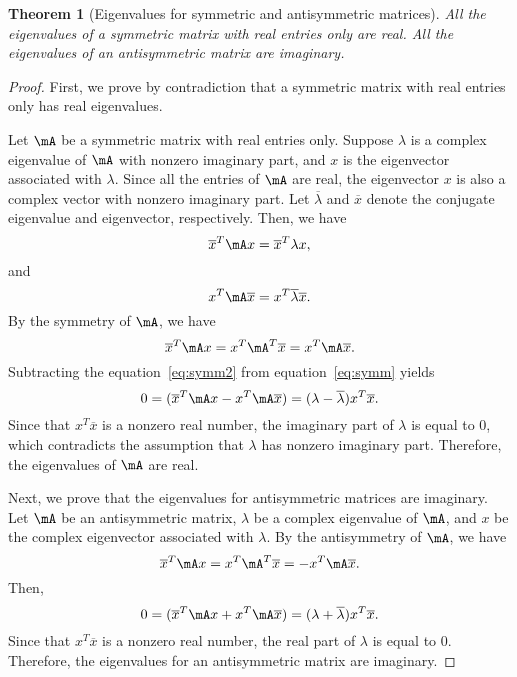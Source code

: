\documentclass[11pt]{article}
\theoremstyle{plain}
\newtheorem{thm}{Theorem}[section]
\theoremstyle{definition}
\begin{document}
\begin{thm}[Eigenvalues for symmetric and antisymmetric matrices]\label{thm:symmeign}
All the eigenvalues of a symmetric matrix with real entries only are real. All the eigenvalues of an antisymmetric matrix are imaginary.
\end{thm}
\begin{proof}
	First, we prove by contradiction that a symmetric matrix with real entries only has real eigenvalues. 
	
	Let  $\mA$  be a symmetric  matrix with real entries only. Suppose $\lambda$  is a complex eigenvalue of $\mA$ with nonzero imaginary part, and $x$ is the eigenvector associated with $\lambda$. Since all the entries of $\mA$ are real, the eigenvector $x$ is also a complex vector with nonzero imaginary part. Let $\overline \lambda$ and $\overline x$ denote the conjugate eigenvalue and eigenvector, respectively. Then,  we have
	\begin{equation}\label{eq:symm}
		\overline x^T \mA x = \overline x^T \lambda x,
	\end{equation} 
	and
	\begin{equation}\label{eq:symm2}
		x^T \mA \overline x = x^T \overline \lambda \overline x.
	\end{equation}
	 By the symmetry of $\mA$, we have
	\[ \overline x^T \mA x  = x^T \mA^T \overline x = x^T \mA \overline x .\] 
	 Subtracting the equation~\eqref{eq:symm2} from equation~\eqref{eq:symm} yields	\[  0 = ( \overline x^T \mA x -  x^T \mA \overline x ) = (\lambda - \overline \lambda) x^T \overline x.  \]
	Since that $x^T \overline x$ is a nonzero real number, the imaginary part of $\lambda$ is equal to 0, which contradicts the assumption that $\lambda$ has nonzero imaginary part. Therefore, the eigenvalues of $\mA$ are real.
	
	\vspace{0.2cm}
	Next, we prove that the eigenvalues for antisymmetric matrices are imaginary. 
	Let $\mA$ be an antisymmetric matrix,  $\lambda$ be a complex eigenvalue of $\mA$, and $x$ be the complex eigenvector associated with $\lambda$. By the antisymmetry of $\mA$, we have
	\[ \overline x^T \mA x  = x^T \mA^T \overline x  =  -x^T \mA \overline x .  \] 
	Then, 
	\[  0 = ( \overline x^T \mA x +  x^T \mA \overline x ) = (\lambda + \overline \lambda) x^T \overline x.   \]
	Since that $x^T \overline x$ is a nonzero real number, the real part of $\lambda$ is equal to 0. Therefore, the eigenvalues for an antisymmetric matrix are imaginary.
\end{proof}
\end{document}
